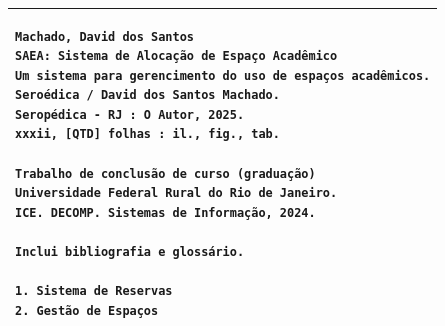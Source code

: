 \clearpage\thispagestyle{empty}\addtocounter{page}{-1}  


\newpage
\null\vfill

\begin{center}
\begin{tabular}{|p{12cm}|}%
\hline
\begin{small}
\begin{verbatim}
Machado, David dos Santos 
SAEA: Sistema de Alocação de Espaço Acadêmico
Um sistema para gerencimento do uso de espaços acadêmicos.
Seroédica / David dos Santos Machado. 
Seropédica - RJ : O Autor, 2025.
xxxii, [QTD] folhas : il., fig., tab.

Trabalho de conclusão de curso (graduação) 
Universidade Federal Rural do Rio de Janeiro.
ICE. DECOMP. Sistemas de Informação, 2024.

Inclui bibliografia e glossário.

1. Sistema de Reservas
2. Gestão de Espaços

\end{verbatim}
\end{small}
\\ \hline
\end{tabular}
\end{center}

\clearpage